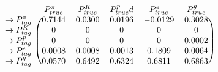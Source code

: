 \documentclass{standalone}
\begin{document}

$\displaystyle
\begin{blockarray}{cccccc}
    & P^\pi_{true} & P^K_{true} & P^p_{true} d & P^e_{true} & P^g_{true} \\
\begin{block}{c(ccccc)}
    \rightarrow P^\pi_{tag}  & 0.7144  & 0.0300  & 0.0196  & -0.0129  & 0.3028 \\
    \rightarrow P^K_{tag}    & 0       & 0       & 0       &  0       & 0      \\
    \rightarrow P^p_{tag}    & 0       & 0       & 0       &  0       & 0.0002 \\
    \rightarrow P^e_{tag}    & 0.0008  & 0.0008  & 0.0013  &  0.1809  & 0.0064 \\
    \rightarrow P^g_{tag}    & 0.0570  & 0.6492  & 0.6324  &  0.6811  & 0.6863 \\
\end{block}
\end{blockarray}
$
\end{document}
